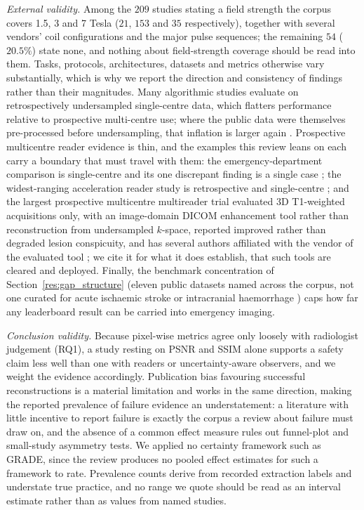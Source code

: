 \documentclass[review,authoryear]{elsarticle}
\begin{document}
\emph{External validity.} Among the $209$ studies stating a field strength the corpus
covers 1.5, 3 and 7 Tesla ($21$, $153$ and $35$ respectively), together with several
vendors' coil configurations and the major pulse sequences; the remaining $54$ ($20.5\%$)
state none, and nothing about field-strength coverage should be read into them. Tasks,
protocols, architectures, datasets and metrics otherwise vary substantially, which is why
we report the direction and consistency of findings rather than their magnitudes. Many
algorithmic studies evaluate on retrospectively undersampled single-centre data, which
flatters performance relative to prospective multi-centre use; where the public data were
themselves pre-processed before undersampling, that inflation is larger again
\citep{shimron2022implicit}. Prospective multicentre reader evidence is thin, and the
examples this review leans on each carry a boundary that must travel with them: the
emergency-department comparison is single-centre and its one discrepant finding is a single
case \citep{lang2024ultrafast}; the widest-ranging acceleration reader study is
retrospective and single-centre \citep{radmanesh2022exploring}; and the largest prospective
multicentre multireader trial evaluated 3D T1-weighted acquisitions only, with an
image-domain DICOM enhancement tool rather than reconstruction from undersampled
$k$-space, reported improved rather than degraded lesion conspicuity, and has several
authors affiliated with the vendor of the evaluated tool \citep{bash2021deep}; we cite
it for what it does establish, that such tools are cleared and deployed. Finally, the
benchmark concentration of Section~\ref{res:gap_structure} (eleven public datasets named
across the corpus, not one curated for acute ischaemic stroke or intracranial haemorrhage
) caps how far any leaderboard result can be carried into emergency imaging.

\emph{Conclusion validity.} Because pixel-wise metrics agree only loosely with
radiologist judgement (RQ1), a study resting on PSNR and SSIM alone supports a safety
claim less well than one with readers or uncertainty-aware observers, and we weight
the evidence accordingly. Publication bias favouring successful reconstructions is a
material limitation and works in the same direction, making the reported prevalence of
failure evidence an understatement: a literature with little incentive to report
failure is exactly the corpus a review about failure must draw on, and the absence of
a common effect measure rules out funnel-plot and small-study asymmetry tests. We
applied no certainty framework such as GRADE, since the review produces no pooled
effect estimates for such a framework to rate. Prevalence counts derive from recorded
extraction labels and understate true practice, and no range we quote should be read
as an interval estimate rather than as values from named studies.
\end{document}
